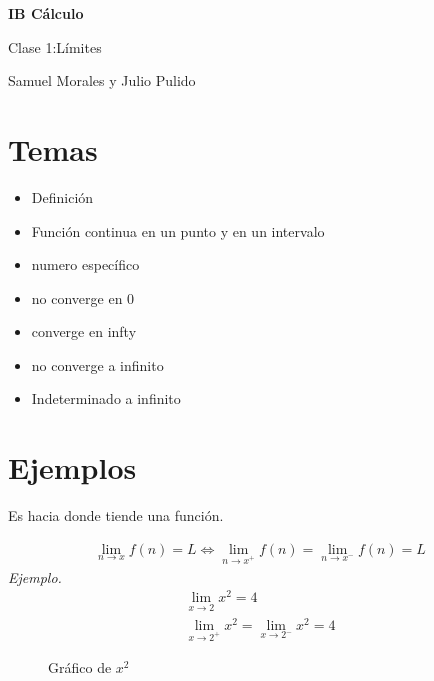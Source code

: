 \documentclass[spanish,12pt]{article}
\begin{document}
	\begin{titlepage}
	\begin{center}
	\hspace{0pt}
	\vfill
	{\Large\textbf{{IB Cálculo}}}
	
	\medskip
	Clase 1:Límites
	
	\medskip
    Samuel Morales y Julio Pulido
	
	\thispagestyle{empty}
	\vfill
	\end{center}
	\end{titlepage}
\newpage
\tableofcontents
\newpage
\section{Temas}
\begin{itemize}
    \item Definición
    \item Función continua en un punto y en un intervalo
    \item numero específico
    \item no converge en 0
    \item converge en infty
    \item no converge a infinito
    \item Indeterminado a infinito
\end{itemize}
\section{Ejemplos}
Es hacia donde tiende una función.

\begin{align*}
    \lim_{n\to x}f(n)=L \iff \lim_{n\to x^+}f(n)=\lim_{n\to x^-}f(n)=L
\end{align*}
\textit{Ejemplo.}
\begin{align*}
    \lim_{x\to 2} x^2=4\\
    \lim_{x\to 2^+} x^2=\lim_{x\to2^-}x^2=4
\end{align*}
\begin{figure}[h]
		\begin{center}
	\caption{Gráfico de $x^2$}
	\end{center}
	\end{figure}
	
\end{document}
